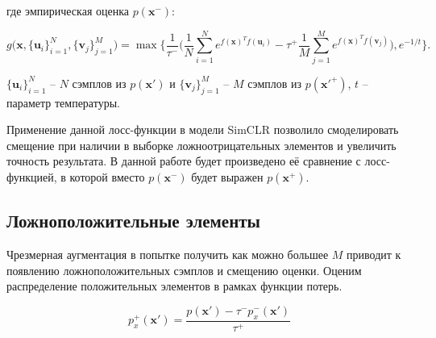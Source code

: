\documentclass[a4paper, 14pt]{article}
\begin{document}
\noindent где эмпирическая оценка $p(\mathbf{x}^-)$:

\begin{equation}\label{eq:6}
g\big(\textbf{x}, \{\textbf{u}_i\}_{i=1}^N, \{\textbf{v}_j\}_{j=1}^M\big) = \max \bigg\{ \frac{1}{\tau^-}\bigg(\frac{1}{N} \sum \limits_{i=1}^N e^{f(\textbf{x})^T f(\textbf{u}_i)} - \tau^+ \frac{1}{M} \sum \limits_{j=1}^M e^{f(\textbf{x})^T f(\textbf{v}_j)}\bigg), e^{-1/t}\bigg\}.
\end{equation}

$\{\textbf{u}_i\}_{i=1}^N$ -- $N$ сэмплов из $p(\mathbf{x'})$ и $\{\textbf{v}_j\}_{j=1}^M$ -- $M$ сэмплов из $p(\mathbf{x'}^+)$, $t$ -- параметр температуры.



Применение данной лосс-функции в модели SimCLR позволило смоделировать смещение при наличии в выборке ложноотрицательных элементов и увеличить точность результата. В данной работе будет произведено её сравнение с лосс-функцией, в которой вместо $p(\mathbf{x}^-)$ будет выражен $p(\mathbf{x}^+)$.

\subsection{Ложноположительные элементы}

Чрезмерная аугментация в попытке получить как можно большее $M$ приводит к появлению ложноположительных сэмплов и смещению оценки. Оценим распределение положительных элементов в рамках функции потерь.

\begin{equation}\label{eq:7}
p_x^+ (\textbf{x}') = \frac{p(\textbf{x}') - \tau^- p^-_x(\textbf{x}')}{\tau^+}
\end{equation}
\end{document}
